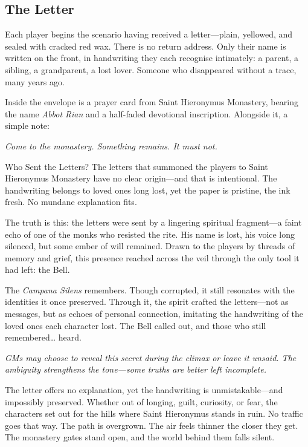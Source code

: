 \documentclass[twocolumn,nodeprecatedcode,bg=print]{dndbook/dndbook}
\begin{document}
\subsection*{The Letter}

Each player begins the scenario having received a letter—plain, yellowed, and sealed with cracked red wax. There is no return address. Only their name is written on the front, in handwriting they each recognise intimately: a parent, a sibling, a grandparent, a lost lover. Someone who disappeared without a trace, many years ago.

Inside the envelope is a prayer card from Saint Hieronymus Monastery, bearing the name \emph{Abbot Rian} and a half-faded devotional inscription. Alongside it, a simple note:

\begin{WyrdExample}
   \textit{Come to the monastery. Something remains. It must not.}
\end{WyrdExample}
\begin{WyrdSidebar}[float=!b]{Who Sent the Letters?}
    The letters that summoned the players to Saint Hieronymus Monastery have no clear origin—and that is intentional. The handwriting belongs to loved ones long lost, yet the paper is pristine, the ink fresh. No mundane explanation fits.
    
    The truth is this: the letters were sent by a lingering spiritual fragment—a faint echo of one of the monks who resisted the rite. His name is lost, his voice long silenced, but some ember of will remained. Drawn to the players by threads of memory and grief, this presence reached across the veil through the only tool it had left: the Bell.
    
    The \emph{Campana Silens} remembers. Though corrupted, it still resonates with the identities it once preserved. Through it, the spirit crafted the letters—not as messages, but as echoes of personal connection, imitating the handwriting of the loved ones each character lost. The Bell called out, and those who still remembered… heard.
    
    \emph{GMs may choose to reveal this secret during the climax or leave it unsaid. The ambiguity strengthens the tone—some truths are better left incomplete.}
\end{WyrdSidebar}
    
The letter offers no explanation, yet the handwriting is unmistakable—and impossibly preserved. Whether out of longing, guilt, curiosity, or fear, the characters set out for the hills where Saint Hieronymus stands in ruin. No traffic goes that way. The path is overgrown. The air feels thinner the closer they get. The monastery gates stand open, and the world behind them falls silent.
\end{document}
